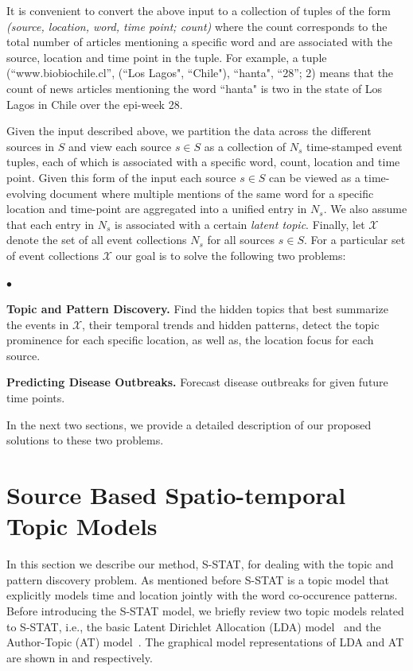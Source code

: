 \documentclass{sig-alternate}
\newcommand{\squishlist}{
   \begin{list}{$\bullet$}
    {
      \setlength{\itemsep}{0pt}
      \setlength{\parsep}{3pt}
      \setlength{\topsep}{3pt}
      \setlength{\partopsep}{0pt}
      \setlength{\leftmargin}{1.5em}
      \setlength{\labelwidth}{1em}
      \setlength{\labelsep}{0.5em} } }
\newcommand{\squishend}{
    \end{list}  }
\newcommand{\model}{{S-STAT}\xspace} %
\begin{document}
 It is convenient to convert the above input to a collection of tuples of the form {\em (source, location, word, time point; count)} where the count corresponds to the total number of articles mentioning a specific word and are associated with the source, location and time point in the tuple. For example, a tuple (``www.biobiochile.cl'', (``Los Lagos", ``Chile"), ``hanta", ``28''; 2) means that the count of news articles mentioning the word ``hanta" is two in the state of Los Lagos in Chile over the epi-week 28.  

Given the input described above, we partition the data across the different sources in $S$ and view each source $s \in S$ as a collection of $N_s$ time-stamped event tuples, each of which is associated with a specific word, count, location and time point. Given this form of the input each source $s \in S$ can be viewed as a time-evolving document where multiple mentions of the same word for a specific location and time-point are aggregated into a unified entry in $N_s$. We also assume that each entry in $N_s$ is associated with a certain {\em latent topic}. Finally, let $\mathcal{X}$ denote the set of all event collections $N_s$ for all sources $s \in S$. For a particular set of event collections $\mathcal{X}$ our goal is to solve the following two problems:
\squishlist
\item {\bf Topic and Pattern Discovery.} Find the hidden topics that best summarize the events in $\mathcal{X}$, their temporal trends and hidden patterns, detect the topic prominence for each specific location, as well as, the location focus for each source.
\item {\bf Predicting Disease Outbreaks.} Forecast disease outbreaks for given future time points. 
\squishend
In the next two sections, we provide a detailed description of our proposed solutions to these two problems.

\section{Source Based Spatio-temporal \\ Topic Models}
\label{sec:model}
In this section we describe our method, \model, for dealing with the topic and pattern discovery problem. As mentioned before \model is a topic model that explicitly models time and location jointly with the word co-occurence patterns. Before introducing the \model model, we briefly review two topic models related to \model, i.e., the basic Latent Dirichlet Allocation (LDA) model~\cite{blei:2003} and the Author-Topic (AT) model~\cite{rosen:2004}. The graphical model representations of LDA and AT are shown in  and  respectively.
\end{document}
